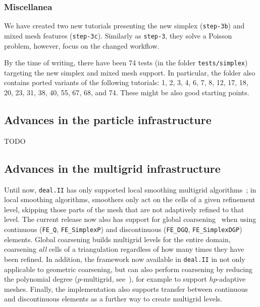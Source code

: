 \documentclass{ansarticle-preprint}
\newcommand{\specialword}[1]{\texttt{#1}}
\newcommand{\dealii}{{\specialword{deal.II}}\xspace}
\begin{document}
\subsubsection{Miscellanea}

We have created two new tutorials presenting the new simplex (\texttt{step-3b}) and mixed mesh features
(\texttt{step-3c}). Similarly as \texttt{step-3}, they solve a Poisson problem, however, focus
on the changed workflow.

By the time of writing, there have been 74 tests (in the folder \texttt{tests/simplex})
targeting the new simplex and mixed mesh support. In particular, the folder also
contains ported variants of the following tutorials: 1, 2, 3, 4, 6, 7, 8, 12, 17, 18, 20, 23, 31, 38,
40, 55, 67, 68, and 74. These might be also good starting points.


\subsection{Advances in the particle infrastructure}
\label{subsec:particles}

TODO

\subsection{Advances in the multigrid infrastructure}
\label{subsec:mg}

Until now, \dealii has only supported local smoothing multigrid
algorithms~\citep{ClevengerHeisterKanschatKronbichler2019}; in local
smoothing algorithms, smoothers only act on the cells of a given refinement level,
skipping those parts of the mesh that are not adaptively refined to that level.
The current release now also has support for global coarsening~\citep{becker00} when
using continuous (\texttt{FE\_Q}, \texttt{FE\_SimplexP}) and
discontinuous (\texttt{FE\_DGQ}, \texttt{FE\_SimplexDGP})
elements. Global coarsening builds multigrid levels for the entire
domain, coarsening \textit{all} cells of a triangulation regardless of
how many times they have been refined. In addition, the framework now available in
\dealii{} in not only applicable to geometric coarsening, but can also
perform coarsening by reducing the polynomial degree ($p$-multigrid,
see~\cite{Fehn2020}), for example
to support $hp$-adaptive meshes.
Finally, the implementation also supports transfer between continuous
and discontinuous elements as a further way to create multigrid levels.
\end{document}
